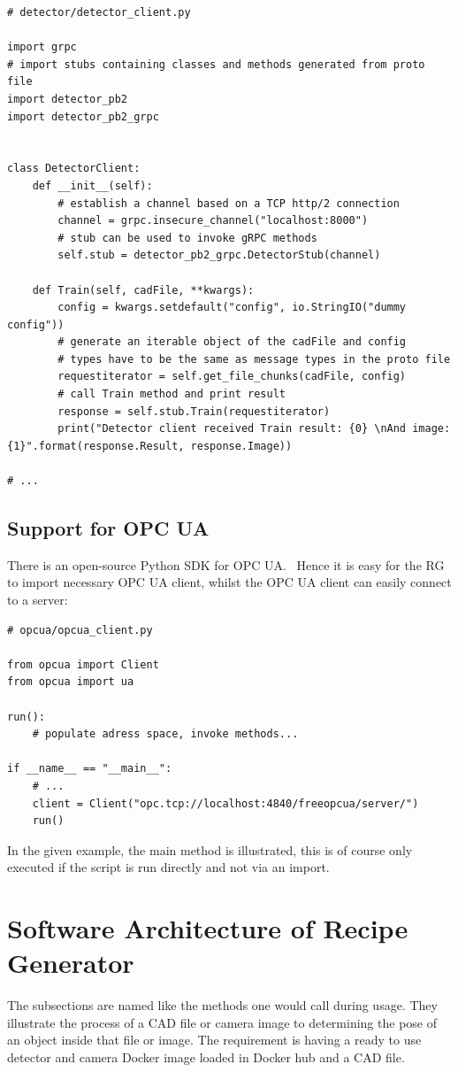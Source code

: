 \begin{verbatim}
# detector/detector_client.py

import grpc
# import stubs containing classes and methods generated from proto file
import detector_pb2
import detector_pb2_grpc


class DetectorClient:
    def __init__(self):
        # establish a channel based on a TCP http/2 connection
        channel = grpc.insecure_channel("localhost:8000")
        # stub can be used to invoke gRPC methods
        self.stub = detector_pb2_grpc.DetectorStub(channel)
    
    def Train(self, cadFile, **kwargs):
        config = kwargs.setdefault("config", io.StringIO("dummy config"))
        # generate an iterable object of the cadFile and config
        # types have to be the same as message types in the proto file
        requestiterator = self.get_file_chunks(cadFile, config)
        # call Train method and print result
        response = self.stub.Train(requestiterator)
        print("Detector client received Train result: {0} \nAnd image: {1}".format(response.Result, response.Image))
        
# ...
\end{verbatim}

\subsection{Support for OPC UA}
There is an open-source Python SDK for OPC UA.~\cite{FreeOpcUa-Documentation2019OPC2019} Hence it is easy for the RG to import necessary OPC UA client, whilst the OPC UA client can easily connect to a server:
\begin{verbatim}
# opcua/opcua_client.py

from opcua import Client
from opcua import ua

run():
    # populate adress space, invoke methods...

if __name__ == "__main__":
    # ...
    client = Client("opc.tcp://localhost:4840/freeopcua/server/")
    run()
\end{verbatim}

In the given example, the main method is illustrated, this is of course only executed if the script is run directly and not via an import.

\section{Software Architecture of Recipe Generator}
The subsections are named like the methods one would call during usage. They illustrate the process of a CAD file or camera image to determining the pose of an object inside that file or image. The requirement is having a ready to use detector and camera Docker image loaded in Docker hub and a CAD file. 


